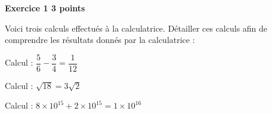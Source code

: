 \textbf{Exercice 1 \hfill 3 points}

\bigskip
 
Voici trois calculs effectués à la calculatrice. Détailler ces calculs afin de comprendre les résultats donnés par la calculatrice : 

\smallskip
 
Calcul  : $\dfrac{5}{6} - \dfrac{3}{4} = \dfrac{1}{12}$
 
\smallskip

Calcul  : $\sqrt{18} = 3\sqrt{2}$

\smallskip
 
Calcul  : $8 \times 10^{15} + 2 \times 10^{15} = 1 \times 10^{16}$

\bigskip
 
